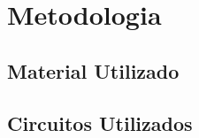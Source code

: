\section{Metodologia}
    \subsection{Material Utilizado}
        
    \subsection{Circuitos Utilizados}
        
